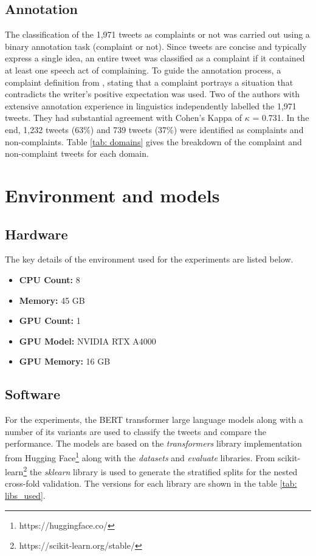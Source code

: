 \subsection{Annotation}
The classification of the 1,971 tweets as complaints or not was carried out using a binary annotation task (complaint or not). Since tweets are concise and typically express a single idea, an entire tweet was classified as a complaint if it contained at least one speech act of complaining. To guide the annotation process, a complaint definition from \cite{olshtain_speechact_1987}, stating that a complaint portrays a situation that contradicts the writer's positive expectation was used. Two of the authors with extensive annotation experience in linguistics independently labelled the 1,971 tweets. They had substantial agreement \cite{artsteinInterCoderAgreementComputational2008} with Cohen's Kappa of $\kappa$ = 0.731. In the end, 1,232 tweets (63\%) and 739 tweets (37\%) were identified as complaints and non-complaints. Table \ref{tab: domains} gives the breakdown of the complaint and non-complaint tweets for each domain.

\section{Environment and models}

\subsection{Hardware}
The key details of the environment used for the experiments are listed below. 
\begin{itemize}
    \small
    \item \textbf{CPU Count:} 8
    \item \textbf{Memory:} 45 GB
    \item \textbf{GPU Count:} 1
    \item \textbf{GPU Model:} NVIDIA RTX A4000
    \item \textbf{GPU Memory:} 16 GB
\end{itemize}

\subsection{Software}
For the experiments, the BERT transformer large language models along with a number of its variants are used to classify the tweets and compare the performance. The models are based on the \textit{transformers} library implementation from Hugging Face\footnote{https://huggingface.co/} along with the \textit{datasets} and \textit{evaluate} libraries. From scikit-learn\footnote{https://scikit-learn.org/stable/} the \textit{sklearn} library is used to generate the stratified splits for the nested cross-fold validation. The versions for each library are shown in the table \ref{tab: libs_used}.


